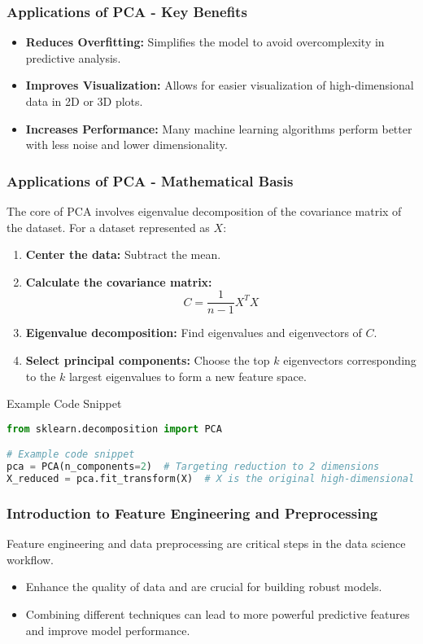 \documentclass[aspectratio=169]{beamer}
\begin{document}
\begin{frame}[fragile]
    \frametitle{Applications of PCA - Key Benefits}
    
    \begin{itemize}
        \item \textbf{Reduces Overfitting:} Simplifies the model to avoid overcomplexity in predictive analysis.
        \item \textbf{Improves Visualization:} Allows for easier visualization of high-dimensional data in 2D or 3D plots.
        \item \textbf{Increases Performance:} Many machine learning algorithms perform better with less noise and lower dimensionality.
    \end{itemize}
\end{frame}

\begin{frame}[fragile]
    \frametitle{Applications of PCA - Mathematical Basis}
    
    The core of PCA involves eigenvalue decomposition of the covariance matrix of the dataset. For a dataset represented as \(X\):
    
    \begin{enumerate}
        \item \textbf{Center the data:} Subtract the mean.
        \item \textbf{Calculate the covariance matrix:} 
        \[
        C = \frac{1}{n - 1} X^T X
        \]
        \item \textbf{Eigenvalue decomposition:} Find eigenvalues and eigenvectors of \(C\).
        \item \textbf{Select principal components:} Choose the top \(k\) eigenvectors corresponding to the \(k\) largest eigenvalues to form a new feature space.
    \end{enumerate}

    \begin{block}{Example Code Snippet}
    \begin{lstlisting}[language=Python]
from sklearn.decomposition import PCA

# Example code snippet
pca = PCA(n_components=2)  # Targeting reduction to 2 dimensions
X_reduced = pca.fit_transform(X)  # X is the original high-dimensional dataset
    \end{lstlisting}
    \end{block}
\end{frame}

\begin{frame}
  \frametitle{Introduction to Feature Engineering and Preprocessing}
  Feature engineering and data preprocessing are critical steps in the data science workflow. 
  \begin{itemize}
    \item Enhance the quality of data and are crucial for building robust models.
    \item Combining different techniques can lead to more powerful predictive features and improve model performance.
  \end{itemize}
\end{frame}
\end{document}
